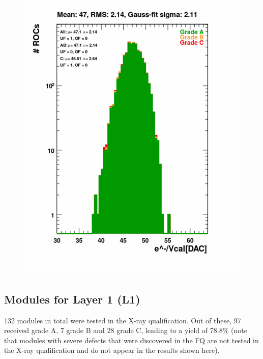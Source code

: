 \documentclass[a4paper,12pt,twoside]{article}
\begin{document}
\begin{itemize}
\begin{figure} [h!]
\begin{minipage}{.48\textwidth}
  \includegraphics[width=\textwidth]{./Figures/Xray_VcalSlope.pdf}
  \label{Slope}
\end{minipage}
\end{figure}


\end{itemize}



\subsection{Modules for Layer 1 (L1)}

132 modules in total were tested in the X-ray qualification. Out of these, 97 received grade A, 7 grade B and 28 grade C, leading to a yield of 78.8\% (note that modules with severe defects that were discovered in the FQ are not tested in the X-ray qualification and do not appear in the results shown here). 
\end{document}
